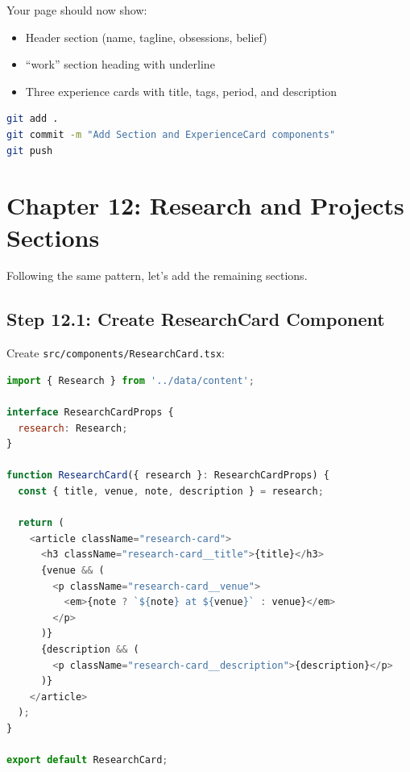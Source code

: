 \documentclass[12pt,a4paper]{article}
\begin{document}
\begin{checkpoint}
Your page should now show:
\begin{itemize}
    \item[$\square$] Header section (name, tagline, obsessions, belief)
    \item[$\square$] ``work'' section heading with underline
    \item[$\square$] Three experience cards with title, tags, period, and description
\end{itemize}
\end{checkpoint}

\begin{gitcommit}
\begin{lstlisting}[language=bash]
git add .
git commit -m "Add Section and ExperienceCard components"
git push
\end{lstlisting}
\end{gitcommit}

\section{Chapter 12: Research and Projects Sections}

Following the same pattern, let's add the remaining sections.

\subsection{Step 12.1: Create ResearchCard Component}

Create \texttt{src/components/ResearchCard.tsx}:

\begin{lstlisting}[language=JavaScript,caption={src/components/ResearchCard.tsx}]
import { Research } from '../data/content';

interface ResearchCardProps {
  research: Research;
}

function ResearchCard({ research }: ResearchCardProps) {
  const { title, venue, note, description } = research;

  return (
    <article className="research-card">
      <h3 className="research-card__title">{title}</h3>
      {venue && (
        <p className="research-card__venue">
          <em>{note ? `${note} at ${venue}` : venue}</em>
        </p>
      )}
      {description && (
        <p className="research-card__description">{description}</p>
      )}
    </article>
  );
}

export default ResearchCard;
\end{lstlisting}
\end{document}
